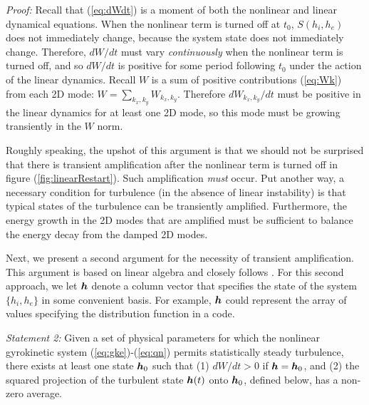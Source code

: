 \documentclass[12pt,superscriptaddress]{revtex4}
\newcommand{\vect}[1]{\mbox{\boldmath $#1$}}
\begin{document}
{\it Proof:}
Recall that (\ref{eq:dWdt}) is a moment of both the nonlinear and linear dynamical equations.
When the nonlinear term is turned off at $t_0$, $S(h_i,h_e)$ does not immediately change, because
the system state does not immediately change. Therefore, $dW/dt$ must vary \emph{continuously}
when the nonlinear term is turned off, and so $dW/dt$ is positive for some period following $t_0$ under the
action of the linear dynamics.
Recall $W$ is a sum of positive contributions (\ref{eq:Wk}) from each 2D mode:
$W = \sum_{k_x,k_y} W_{k_x,k_y}$.
Therefore $dW_{k_x,k_y}/dt$ must be positive in the linear dynamics for at least one 2D mode,
so this mode must be growing transiently in the $W$ norm.

Roughly speaking, the upshot of this argument is that we should not be surprised that there is transient amplification
after the nonlinear term is turned off in figure (\ref{fig:linearRestart}).
Such amplification \emph{must} occur.
Put another way, a necessary condition
for turbulence (in the absence of linear instability) is that typical states of the turbulence
can be transiently amplified. Furthermore, the energy growth in the 2D modes that are amplified
must be sufficient to balance the energy decay from the damped 2D modes.

Next, we present a second argument for the necessity of transient amplification.
This argument is based on linear algebra and closely follows \cite{DelSoleNecessity}.
For this second approach, we let $\vect{h}$ denote
a column vector that specifies the state of the system $\{h_i,h_e\}$ in some convenient basis.
For example, $\vect{h}$ could represent the array of values specifying the distribution function in a code.

{\it Statement 2:} Given a set of physical parameters for which
the nonlinear gyrokinetic system (\ref{eq:gke})-(\ref{eq:qn})
permits statistically steady turbulence,
there exists at least one state $\vect{h}_0$ such that
(1) $dW/dt>0$ if $\vect{h} = \vect{h}_0$, and
(2) the squared projection of the turbulent state $\vect{h}(t)$
onto $\vect{h}_0$, defined below, has a non-zero average.
\end{document}
